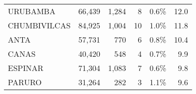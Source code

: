 \begin{tabular}{lrrrrr}
	\cellcolor[HTML]{FFFFC7}URUBAMBA      & 66,439                                                         & 1,284                                                                           & 8                                                              & 0.6\%                                                                  & 12.0                                                                                                                               \\
	\cellcolor[HTML]{FFFFC7}CHUMBIVILCAS  & 84,925                                                         & 1,004                                                                           & 10                                                             & 1.0\%                                                                  & 11.8                                                                                                                               \\
	\cellcolor[HTML]{FFFFC7}ANTA          & 57,731                                                         & 770                                                                             & 6                                                              & 0.8\%                                                                  & 10.4                                                                                                                               \\
	\cellcolor[HTML]{FFFFC7}CANAS         & 40,420                                                         & 548                                                                             & 4                                                              & 0.7\%                                                                  & 9.9                                                                                                                                \\
	\cellcolor[HTML]{FFFFC7}ESPINAR       & 71,304                                                         & 1,083                                                                           & 7                                                              & 0.6\%                                                                  & 9.8                                                                                                                                \\
	\cellcolor[HTML]{FFFFC7}PARURO        & 31,264                                                         & 282                                                                             & 3                                                              & 1.1\%                                                                  & 9.6                                                                                                                                \\

\end{tabular}
